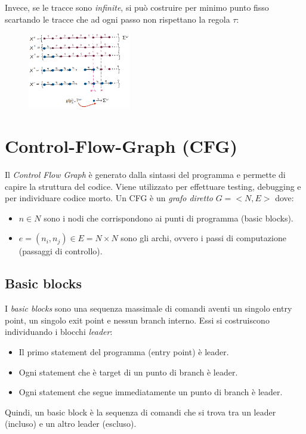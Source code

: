 \documentclass[a4paper,oneside,titlepage]{book}
\begin{document}
\noindent
Invece, se le tracce sono \textit{infinite}, si può costruire per minimo punto fisso scartando le tracce che ad ogni passo non rispettano la regola $\tau$:
\begin{figure}[htp]
	\centering
	\includegraphics[width=0.4\textwidth]{fp3.png}
\end{figure}


\section{Control-Flow-Graph (CFG)} %
Il \textit{Control Flow Graph} è generato dalla sintassi del programma e permette di capire la struttura del codice. Viene utilizzato per effettuare testing, debugging e per individuare codice morto. Un CFG è un \textit{grafo diretto} $G = <N,E>$ dove:
\begin{itemize}
	\item $n \in N$ sono i nodi che corrispondono ai punti di programma (basic blocks).
	\item $e = (n_i, n_j) \in E = N \times N$ sono gli archi, ovvero i passi di computazione (passaggi di controllo).
\end{itemize}

\subsection{Basic blocks}
I \textit{basic blocks} sono una sequenza massimale di comandi aventi un singolo entry point, un singolo exit point e nessun branch interno. Essi si costruiscono individuando i blocchi \textit{leader}:
\begin{itemize}
	\item Il primo statement del programma (entry point) è leader.
	\item Ogni statement che è target di un punto di branch è leader.
	\item Ogni statement che segue immediatamente un punto di branch è leader.
\end{itemize}
Quindi, un basic block è la sequenza di comandi che si trova tra un leader (incluso) e un altro leader (escluso).
\end{document}

